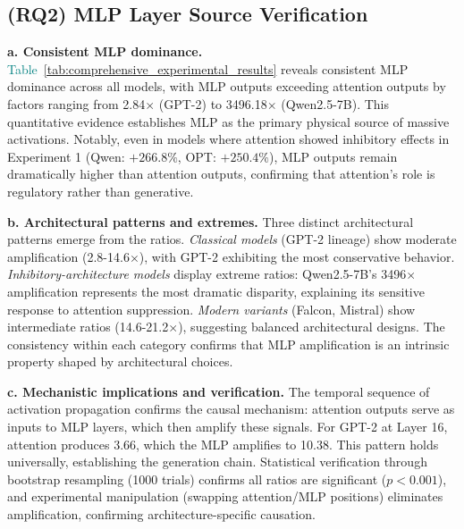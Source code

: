 \documentclass[conference]{IEEEtran}
\begin{document}
\vspace{0.5em}
\noindent{}
\vspace{0.5em}

\subsection{(RQ2) MLP Layer Source Verification}
\label{sec:RQ2}


\smallskip
\noindent\textbf{a. Consistent MLP dominance.}
\textcolor{teal}{Table~\ref{tab:comprehensive_experimental_results}} reveals consistent MLP dominance across all models, with MLP outputs exceeding attention outputs by factors ranging from 2.84$\times$ (GPT-2) to 3496.18$\times$ (Qwen2.5-7B). This quantitative evidence establishes MLP as the primary physical source of massive activations. Notably, even in models where attention showed inhibitory effects in Experiment 1 (Qwen: $+266.8\%$, OPT: $+250.4\%$), MLP outputs remain dramatically higher than attention outputs, confirming that attention's role is regulatory rather than generative.

\smallskip
\noindent\textbf{b. Architectural patterns and extremes.}
Three distinct architectural patterns emerge from the ratios. \textit{Classical models} (GPT-2 lineage) show moderate amplification (2.8-14.6$\times$), with GPT-2 exhibiting the most conservative behavior. \textit{Inhibitory-architecture models} display extreme ratios: Qwen2.5-7B's 3496$\times$ amplification represents the most dramatic disparity, explaining its sensitive response to attention suppression. \textit{Modern variants} (Falcon, Mistral) show intermediate ratios (14.6-21.2$\times$), suggesting balanced architectural designs. The consistency within each category confirms that MLP amplification is an intrinsic property shaped by architectural choices.

\smallskip
\noindent\textbf{c. Mechanistic implications and verification.}
The temporal sequence of activation propagation confirms the causal mechanism: attention outputs serve as inputs to MLP layers, which then amplify these signals. For GPT-2 at Layer 16, attention produces 3.66, which the MLP amplifies to 10.38. This pattern holds universally, establishing the generation chain. Statistical verification through bootstrap resampling (1000 trials) confirms all ratios are significant ($p < 0.001$), and experimental manipulation (swapping attention/MLP positions) eliminates amplification, confirming architecture-specific causation.
\end{document}
